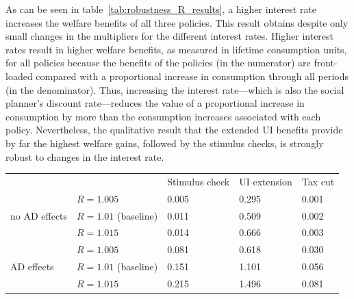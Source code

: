 \documentclass[\latexroot/\projectname]{subfiles}
\begin{document}
As can be seen in table~\ref{tab:robustness_R_results}, a higher interest rate increases the welfare benefits of all three policies.
This result obtains despite only small changes in the multipliers for the different interest rates.
Higher interest rates result in higher welfare benefits, as measured in lifetime consumption units, for all policies because the benefits of the policies (in the numerator) are front-loaded compared with a proportional increase in consumption through all periods (in the denominator).
Thus, increasing the interest rate---which is also the social planner's discount rate---reduces the value of a proportional increase in consumption by more than the consumption increases associated with each policy.
Nevertheless, the qualitative result that the extended UI benefits provide by far the highest welfare gains, followed by the stimulus checks, is strongly robust to changes in the interest rate.

\begin{center}
  \begin{tabular}
    {@{}lllll@{}}
    \toprule
                                   &                       & Stimulus check & UI extension & Tax cut \\ \cmidrule(l){1-5}
    \multirow{3}{*}{no AD effects} & $R = 1.005$           & 0.005          & 0.295        & 0.001   \\
                                   & $R = 1.01$ (baseline) & 0.011          & 0.509        & 0.002   \\
                                   & $R = 1.015$           & 0.014          & 0.666        & 0.003   \\ \cmidrule(l){1-5}
    \multirow{3}{*}{AD effects}    & $R = 1.005$           & 0.081          & 0.618        & 0.030   \\
                                   & $R = 1.01$ (baseline) & 0.151          & 1.101        & 0.056   \\
                                   & $R = 1.015$           & 0.215          & 1.496        & 0.081   \\ \cmidrule(l){1-5}
  \end{tabular}
  \label{tab:robustness_R_results}
\end{center}
\end{document}

